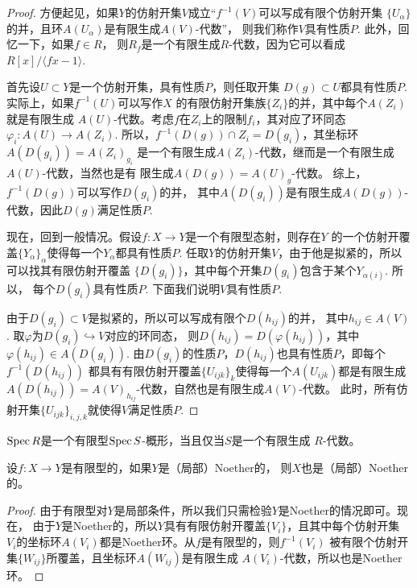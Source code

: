 \begin{proof}
	方便起见，如果$Y$的仿射开集$V$成立“$f^{-1}(V)$可以写成有限个仿射开集
	$\{U_{\alpha}\}$的并，且环$A(U_{\alpha})$是有限生成$A(V)$-代数”，
	则我们称作$V$具有性质$P$. 此外，回忆一下，如果$f\in R$，
	则$R_{f}$是一个有限生成$R$-代数，因为它可以看成
	$R[x]/\langle fx-1\rangle$.

	首先设$U\subset Y$是一个仿射开集，具有性质$P$，则任取开集
	$D(g)\subset U$都具有性质$P$. 实际上，如果$f^{-1}(U)$可以写作$X$
	的有限仿射开集族$\{Z_i\}$的并，其中每个$A(Z_i)$就是有限生成
	$A(U)$-代数。考虑$f$在$Z_i$上的限制$f_i$，其对应了环同态
	$\varphi_i:A(U)\to A(Z_i)$. 
	所以，$f^{-1}(D(g))\cap Z_i=D(g_i)$，其坐标环$A(D(g_i))=A(Z_i)_{g_i}$
	是一个有限生成$A(Z_i)$-代数，继而是一个有限生成$A(U)$-代数，当然也是有
	限生成$A(D(g))=A(U)_g$-代数。
	综上，$f^{-1}(D(g))$可以写作$D(g_i)$的并，
	其中$A(D(g_i))$是有限生成$A(D(g))$-代数，因此$D(g)$满足性质$P$.

	现在，回到一般情况。假设$f:X\to Y$是一个有限型态射，则存在$Y$
	的一个仿射开覆盖$\{Y_\alpha\}_\alpha$使得每一个$Y_\alpha$都具有性质$P$. 
	任取$Y$的仿射开集$V$，由于他是拟紧的，所以可以找其有限仿射开覆盖
	$\{D(g_i)\}$，其中每个开集$D(g_i)$包含于某个$Y_{\alpha(i)}$. 所以，
	每个$D(g_i)$具有性质$P$. 下面我们说明$V$具有性质$P$.
	
	由于$D(g_i)\subset V$是拟紧的，所以可以写成有限个$D(h_{ij})$的并，
	其中$h_{ij}\in A(V)$. 取$\varphi$为$D(g_i)\hookrightarrow V$对应的环同态，
	则$D(h_{ij})=D(\varphi(h_{ij}))$，其中$\varphi(h_{ij})\in A(D(g_i))$.
	由$D(g_i)$的性质$P$，$D(h_{ij})$也具有性质$P$，即每个$f^{-1}(D(h_{ij}))$
	都具有有限仿射开覆盖$\{U_{ijk}\}_k$使得每一个$A(U_{ijk})$都是有限生成
	$A(D(h_{ij}))=A(V)_{h_{ij}}$-代数，自然也是有限生成$A(V)$-代数。
	此时，所有仿射开集$\{U_{ijk}\}_{i,j,k}$就使得$V$满足性质$P$.
\end{proof}

\begin{lem}
	$\operatorname{Spec} R$是一个有限型$\operatorname{Spec} S$-概形，当且仅当$S$是一个有限生成
	$R$-代数。
\end{lem}

\begin{pro}
设$f:X\to Y$是有限型的，如果$Y$是（局部）Noether的，
则$X$也是（局部）Noether的。
\end{pro}

\begin{proof}
由于有限型对$Y$是局部条件，所以我们只需检验$Y$是Noether的情况即可。现在，
由于$Y$是Noether的，所以$Y$具有有限仿射开覆盖$\{V_i\}$，且其中每个仿射开集
$V_i$的坐标环$A(V_i)$都是Noether环。从$f$是有限型的，则$f^{-1}(V_i)$
被有限个仿射开集$\{W_{ij}\}$所覆盖，且坐标环$A(W_{ij})$是有限生成
$A(V_i)$-代数，所以也是Noether环。
\end{proof}


